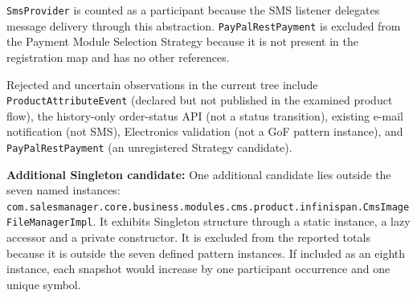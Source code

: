 \documentclass[11pt,a4paper]{article}
\begin{document}
\texttt{Sms\allowbreak{}Provider} is counted as a participant because the SMS listener delegates message delivery through this abstraction. \texttt{Pay\allowbreak{}Pal\allowbreak{}Rest\allowbreak{}Payment} is excluded from the Payment Module Selection Strategy because it is not present in the registration map and has no other references.

Rejected and uncertain observations in the current tree include \texttt{Product\allowbreak{}Attribute\allowbreak{}Event} (declared but not published in the examined product flow), the history-only order-status API (not a status transition), existing e-mail notification (not SMS), Electronics validation (not a GoF pattern instance), and \texttt{Pay\allowbreak{}Pal\allowbreak{}Rest\allowbreak{}Payment} (an unregistered Strategy candidate).

\textbf{Additional Singleton candidate:} One additional candidate lies outside the seven named instances: \texttt{com.\allowbreak{}salesmanager.\allowbreak{}core.\allowbreak{}business.\allowbreak{}modules.\allowbreak{}cms.\allowbreak{}product.\allowbreak{}infinispan.\allowbreak{}CmsImageFileManagerImpl}. It exhibits Singleton structure through a static instance, a lazy accessor and a private constructor. It is excluded from the reported totals because it is outside the seven defined pattern instances. If included as an eighth instance, each snapshot would increase by one participant occurrence and one unique symbol.
\end{document}
